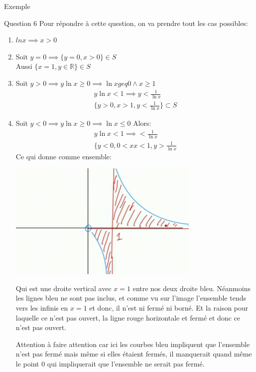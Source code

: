 \begin{parag}{Exemple}
\begin{subparag}{Question 6}
       Pour répondre à cette question, on va prendre tout les cas possibles:
       \begin{enumerate}
           \item $ln x \implies x > 0$
           \item Soit $y = 0 \implies \{ y = 0, x > 0\} \in S$\\
               Aussi $\{ x = 1, y \in \mathbb{R}\} \in S$
           \item Soit $y > 0 \implies y \ln x \geq 0 \implies \ln x geq 0 \wedge x \geq 1$\\
               \begin{align*}
                   y \ln x < 1 \implies y < \frac{1}{\ln x}\\
                   \{y > 0, x > 1, y < \frac{1}{\ln x}\} \subset S
               \end{align*}
           \item Soit $y < 0 \implies y \ln x \geq 0 \implies \ln x \leq 0$ Alors:
               \begin{align*}
                   y \ln x < 1 \implies < \frac{1}{\ln x} \\
                   \{ y < 0, 0 < xx < 1, y > \frac{1}{\ln x}
               \end{align*}
               Ce qui donne comme ensemble:
               \begin{center}
                   \includegraphics[scale=1.3]{12025-03-12.png}
               \end{center}
               Qui est une droite vertical avec $x = 1$ entre nos deux droite bleu. Néanmoins les lignes bleu ne sont pas inclus, et comme vu sur l'image l'ensemble tends vers les infinis en $x = 1$ et donc, il n'est ni fermé ni borné. Et la raison pour laquelle ce n'est pas ouvert, la  ligne rouge horizontale et fermé et donc ce n'est pas ouvert.
               \begin{framedremark}
                   Attention à faire attention car ici les courbes bleu impliquent que l'ensemble n'est pas fermé mais même si elles étaient fermés, il manquerait quand même le point $0$ qui impliquerait que l'ensemble ne serait pas fermé.
               \end{framedremark}
       \end{enumerate}
\end{subparag}
\end{parag}

